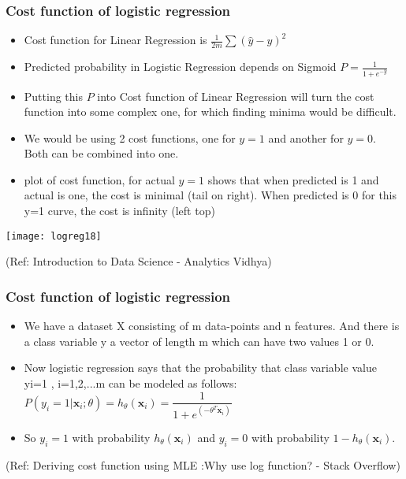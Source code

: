 \begin{frame}[fragile]\frametitle{Cost function of logistic regression}
\begin{itemize}
\item Cost function for Linear Regression is $\frac{1}{2m} \sum (\hat{y} - y)^2$
\item Predicted probability in Logistic Regression depends on Sigmoid $P = \frac{1}{1 + e^{-\hat{y}}}$
\item Putting this $P$ into Cost function of Linear Regression will turn the cost function into some complex one, for which finding minima would be difficult.
\item We would be using 2 cost functions, one for $y=1$ and another for $y=0$. Both can be combined into one.
\item plot of cost function, for actual $y=1$ shows that when predicted is 1 and actual is one, the cost is minimal (tail on right). When predicted is 0 for this y=1 curve, the cost is infinity (left top)
\end{itemize}

\begin{center}
\texttt{[image: logreg18]}
\end{center}

{\tiny (Ref: Introduction to Data Science - Analytics Vidhya)}
\end{frame}


\begin{frame}[fragile]\frametitle{Cost function of logistic regression}
\begin{itemize}
\item We have a dataset X consisting of m data-points and n features. And there is a class variable y a vector of length m which can have two values 1 or 0.
\item  Now logistic regression says that the probability that class variable value yi=1 , i=1,2,...m can be modeled as follows:
$P( y_i =1 | \mathbf{x}_i ; \theta) = h_{\theta}(\mathbf{x}_i) = \dfrac{1}{1+e^{(- \theta^T \mathbf{x}_i)}}$
\item So $y_i = 1$ with probability $h_{\theta}(\mathbf{x}_i)$ and $y_i=0$ with probability $1-h_{\theta}(\mathbf{x}_i)$.
\end{itemize}

{\tiny (Ref: Deriving cost function using MLE :Why use log function? - Stack Overflow)}
\end{frame}

